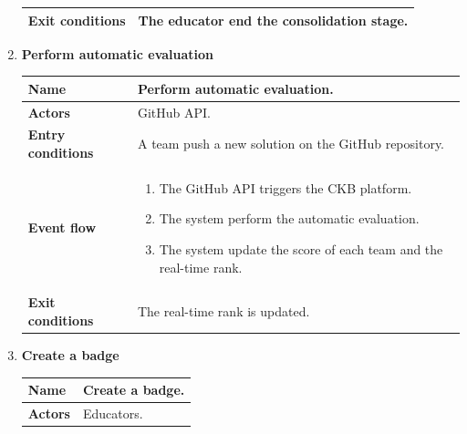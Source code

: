 \begin{enumerate}[label=\textbf{UC.\arabic*}]
\begin{table}[H]
\begin{tabular}{|m{3.2cm}|m{9.8cm}|}
                    \hline
                    \textbf{Exit conditions}  &  The educator end the consolidation stage. \\
                    \hline
                \end{tabular}
        \end{table}
        \item {} \textbf{Perform automatic evaluation}
        \begin{table}[H]
    	    \centering
                \renewcommand{\arraystretch}{1.5}
                \begin{tabular}{|m{3.2cm}|m{9.8cm}|}
                    \hline
                    \textbf{Name} & Perform automatic evaluation. \\
                    \hline
                    \textbf{Actors} & GitHub API. \\
                    \hline
                    \textbf{Entry conditions}  & A team push a new solution on the GitHub repository. \\
                    \hline
                    \textbf{Event flow}  & 
                    \begin{enumerate}[label=\arabic*.]
                        \item The GitHub API triggers the CKB platform.
                        \item The system perform the automatic evaluation.
                        \item The system update the score of each team and the real-time rank.
                    \end{enumerate}\\ 
                    \hline
                    \textbf{Exit conditions}  &  The real-time rank is updated. \\
                    \hline
                \end{tabular}
        \end{table}
        \item {} \textbf{Create a badge}
        \begin{table}[H]
    	    \centering
                \renewcommand{\arraystretch}{1.5}
                \begin{tabular}{|m{3.2cm}|m{9.8cm}|}
                    \hline
                    \textbf{Name} & Create a badge. \\
                    \hline
                    \textbf{Actors} & Educators. \\

\end{tabular}
\end{table}
\end{enumerate}
